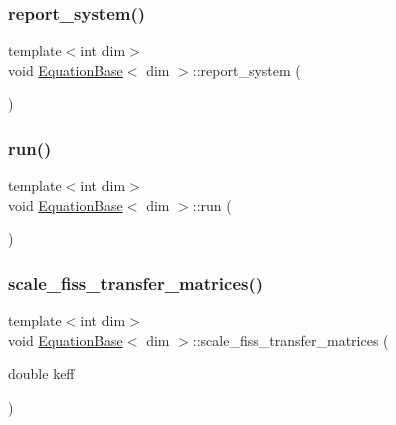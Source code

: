 \mbox{\label{class_equation_base_a9b4d33dbf86898d75754a22fda9c9e98}} 
\subsubsection{\texorpdfstring{report\+\_\+system()}{report\_system()}}
{\footnotesize\ttfamily template$<$int dim$>$ \\
void \hyperlink{class_equation_base}{Equation\+Base}$<$ dim $>$\+::report\+\_\+system (\begin{DoxyParamCaption}{ }\end{DoxyParamCaption})\hspace{0.3cm}{\ttfamily [private]}}

\mbox{\label{class_equation_base_a7692b87c807ce4ed5081dab4dc28decb}} 
\subsubsection{\texorpdfstring{run()}{run()}}
{\footnotesize\ttfamily template$<$int dim$>$ \\
void \hyperlink{class_equation_base}{Equation\+Base}$<$ dim $>$\+::run (\begin{DoxyParamCaption}{ }\end{DoxyParamCaption})}

\mbox{\label{class_equation_base_a13947db6be48085b9dca97117c73b5ca}} 
\subsubsection{\texorpdfstring{scale\+\_\+fiss\+\_\+transfer\+\_\+matrices()}{scale\_fiss\_transfer\_matrices()}}
{\footnotesize\ttfamily template$<$int dim$>$ \\
void \hyperlink{class_equation_base}{Equation\+Base}$<$ dim $>$\+::scale\+\_\+fiss\+\_\+transfer\+\_\+matrices (\begin{DoxyParamCaption}\item[{double}]{keff }\end{DoxyParamCaption})}

